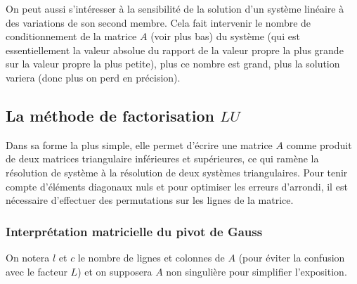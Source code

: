 \documentclass[a4paper,11pt]{article}
\begin{document}
\begin{giacjshere}
On peut aussi s'intéresser à la sensibilité de la solution d'un
système linéaire à des variations de son second membre. Cela fait intervenir
le nombre de conditionnement de la matrice $A$ (voir plus bas) du système (qui
est essentiellement la valeur absolue du rapport de la valeur propre
la plus grande sur la valeur propre la plus petite), plus
ce nombre est grand, plus la solution variera (donc plus on
perd en précision).

\subsection{La méthode de factorisation $LU$} 
Dans sa forme la plus simple, elle permet d'écrire
une matrice $A$ comme produit de deux matrices triangulaire
inférieures et supérieures, ce qui ram\`ene la résolution
de système à la résolution de deux systèmes triangulaires.
Pour tenir compte d'\'el\'ements diagonaux nuls et pour optimiser 
les erreurs d'arrondi, il est n\'ecessaire d'effectuer des
permutations sur les lignes de la matrice.

\subsubsection{Interpr\'etation matricielle du pivot de Gauss}
On notera $l$ et $c$ le nombre de lignes et colonnes de $A$ (pour
\'eviter la confusion avec le facteur $L$) et on
supposera $A$ non singuli\`ere pour simplifier l'exposition.


\end{giacjshere}
\end{document}
